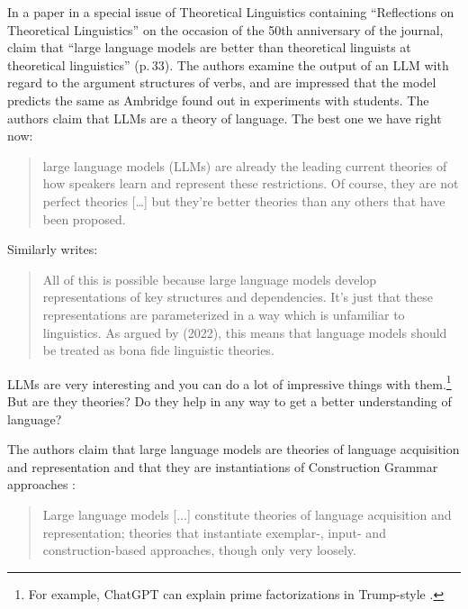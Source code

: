 In a paper in a special issue of Theoretical Linguistics containing ``Reflections on
Theoretical Linguistics'' on the occasion of the 50th anniversary of the journal,
\citet{AmbridgeBlything2024a} claim that ``large language models are better than theoretical
linguists at theoretical linguistics'' (p.\,33). The authors examine the output of an LLM with
regard to the argument structures of verbs, and are impressed that the model predicts the same as
Ambridge found out in experiments with students. The authors claim that LLMs are a theory of
language. The best one we have right now:
\begin{quote}
large language models (LLMs) are already the leading current theories of how speakers learn and
represent these restrictions. Of course, they are not perfect theories [\ldots] but they’re better
theories than any others that have been proposed. \citep[]{AmbridgeBlything2024a}
\end{quote}
Similarly \citet[360]{Piantadosi2024a} writes:
\begin{quote}
All of this is possible because large language models develop representations
of key structures and dependencies. It's just that these representations are parameterized in a way which is unfamiliar to linguistics. As argued by \citeauthor{Baroni2023a}
(2022), this means that language models should be treated as bona fide linguistic
theories. \citep[360]{Piantadosi2024a}
\end{quote}
%
LLMs are very interesting and you can do a lot of impressive things with them.\footnote{%
For example, ChatGPT can explain prime factorizations in Trump-style \citep[356--357]{Piantadosi2024a}.
} But are they theories? Do they help in any way to get a better understanding of language?

The authors claim that large language models are theories of language acquisition and representation
and that they are instantiations of Construction Grammar approaches \citep{Goldberg2006a}: 
\begin{quote}
Large language models [...] constitute theories of language acquisition and representation; theories
that instantiate exemplar-, input- and construction-based approaches, though only very
loosely. \citep[]{AmbridgeBlything2024a}
\end{quote}

